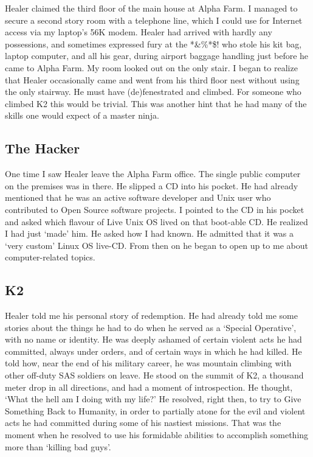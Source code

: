 Healer claimed the third floor of the main house at Alpha Farm.  I managed to secure a second story room with a telephone line, which I could use for Internet access via my laptop's 56K modem.  Healer had arrived with hardly any possessions, and sometimes expressed fury at the *\&\%*\$! who stole his kit bag, laptop computer, and all his gear, during airport baggage handling just before he came to Alpha Farm.  My room looked out on the only stair. I began to realize that Healer occasionally came and went from his third floor nest without using the only stairway. He must have (de)fenestrated and climbed. For someone who climbed K2 this would be trivial. This was another hint that he had many of the skills one would expect of a master ninja.

\subsection*{The Hacker}
\label{pos03:the-hacker}

One time I saw Healer leave the Alpha Farm office. The single public computer on the premises was in there. He slipped a CD into his pocket.  He had already mentioned that he was an active software developer and Unix user who contributed to Open Source software projects.  I pointed to the CD in his pocket and asked which flavour of Live Unix OS lived on that boot-able CD.  He realized I had just `made' him. He asked how I had known. He admitted that it was a `very custom' Linux OS live-CD. From then on he began to open up to me about computer-related topics.

\subsection*{K2}
\label{pos03:k2}

Healer told me his personal story of redemption.  He had already told me some stories about the things he had to do when he served as a `Special Operative', with no name or identity.  He was deeply ashamed of certain violent acts he had committed, always under orders, and of certain ways in which he had killed.  He told how, near the end of his military career, he was mountain climbing with other off-duty SAS soldiers on leave.  He stood on the summit of K2, a thousand meter drop in all directions, and had a moment of introspection.  He thought, `What the hell am I doing with my life?'  He resolved, right then, to try to Give Something Back to Humanity, in order to partially atone for the evil and violent acts he had committed during some of his nastiest missions.  That was the moment when he resolved to use his formidable abilities to accomplish something more than `killing bad guys'.

